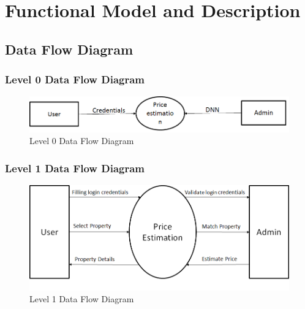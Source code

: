 \documentclass[11pt,fleqn]{book} %
\begin{document}

\section{Functional Model and Description}
\subsection{Data Flow Diagram}

\newpage
\subsubsection{Level 0 Data Flow Diagram}
\begin{center}
    \begin{figure}[!ht]
        \centering
        \includegraphics[scale=0.7]{Pictures/Dataflow0.png}
        \caption{Level 0 Data Flow Diagram}
        \label{fig:my_label}
    \end{figure}
\end{center}

\vspace{20mm}

\subsubsection{Level 1 Data Flow Diagram}
\begin{center}
    \begin{figure}[!ht]
        \centering
        \includegraphics[scale=0.7]{Pictures/Dataflow1.png}
        \caption{Level 1 Data Flow Diagram}
        \label{fig:my_label}
    \end{figure}
\end{center}
\end{document}
